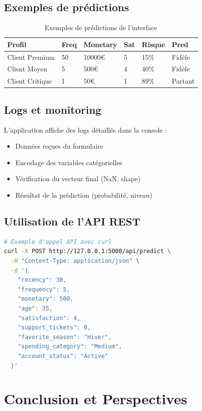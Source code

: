 \documentclass[11pt,a4paper]{article}
\begin{document}
\subsection{Exemples de prédictions}

\begin{table}[H]
\centering
\begin{tabular}{C{3cm} C{2cm} C{2cm} C{2cm} C{2.5cm} C{2cm}}
\toprule
\textbf{Profil} & \textbf{Freq} & \textbf{Monetary} & \textbf{Sat} & \textbf{Risque} & \textbf{Pred} \\
\midrule
Client Premium & 50 & 10000€ & 5 & 15\% & Fidèle \\
Client Moyen & 5 & 500€ & 4 & 40\% & Fidèle \\
Client Critique & 1 & 50€ & 1 & 89\% & Partant \\
\bottomrule
\end{tabular}
\caption{Exemples de prédictions de l'interface}
\end{table}

\subsection{Logs et monitoring}
L'application affiche des logs détaillés dans la console :
\begin{itemize}
    \item Données reçues du formulaire
    \item Encodage des variables catégorielles
    \item Vérification du vecteur final (NaN, shape)
    \item Résultat de la prédiction (probabilité, niveau)
\end{itemize}

\subsection{Utilisation de l'API REST}
\begin{lstlisting}[language=bash]
# Exemple d'appel API avec curl
curl -X POST http://127.0.0.1:5000/api/predict \
  -H "Content-Type: application/json" \
  -d '{
    "recency": 30,
    "frequency": 5,
    "monetary": 500,
    "age": 35,
    "satisfaction": 4,
    "support_tickets": 0,
    "favorite_season": "Hiver",
    "spending_category": "Medium",
    "account_status": "Active"
  }'
\end{lstlisting}

\newpage
\section{Conclusion et Perspectives}
\end{document}
